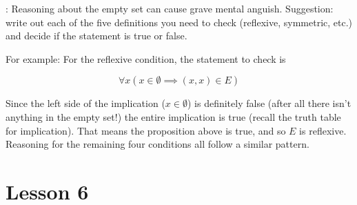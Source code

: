 \documentclass[11pt]{amsart}
\begin{document}
\begin{enumerate}
: Reasoning about the empty set can cause grave mental anguish. Suggestion: write out each of the
five definitions you need to check (reflexive, symmetric, etc.) and decide if the statement is true or false.

For example: For the reflexive condition, the statement to check is

\[
\forall x ( x\in \emptyset \implies (x,x)\in E)
\]

Since the left side of the implication ($x\in \emptyset$) is definitely false (after all there isn't anything in the empty set!)
the entire implication is true (recall the truth table for implication). That means the proposition above is true, and so $E$ is reflexive. Reasoning for the remaining four conditions all follow a similar pattern.\\[5pt]

 \end{enumerate}

\section{Lesson 6}
\end{document}
